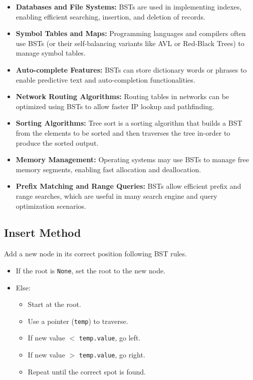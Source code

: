 \begin{itemize}
    \item \textbf{Databases and File Systems:} BSTs are used in implementing indexes, enabling efficient searching, insertion, and deletion of records.

    \item \textbf{Symbol Tables and Maps:} Programming languages and compilers often use BSTs (or their self-balancing variants like AVL or Red-Black Trees) to manage symbol tables.

    \item \textbf{Auto-complete Features:} BSTs can store dictionary words or phrases to enable predictive text and auto-completion functionalities.

    \item \textbf{Network Routing Algorithms:} Routing tables in networks can be optimized using BSTs to allow faster IP lookup and pathfinding.

    \item \textbf{Sorting Algorithms:} Tree sort is a sorting algorithm that builds a BST from the elements to be sorted and then traverses the tree in-order to produce the sorted output.

    \item \textbf{Memory Management:} Operating systems may use BSTs to manage free memory segments, enabling fast allocation and deallocation.

    \item \textbf{Prefix Matching and Range Queries:} BSTs allow efficient prefix and range searches, which are useful in many search engine and query optimization scenarios.
\end{itemize}


\subsection{Insert Method}
Add a new node in its correct position following BST rules.
\begin{itemize}
    \item If the root is \texttt{None}, set the root to the new node.
    \item Else:
    \begin{itemize}
        \item Start at the root.
        \item Use a pointer (\texttt{temp}) to traverse.
        \item If new value $<$ \texttt{temp.value}, go left.
        \item If new value $>$ \texttt{temp.value}, go right.
        \item Repeat until the correct spot is found.
    \end{itemize}
\end{itemize}

